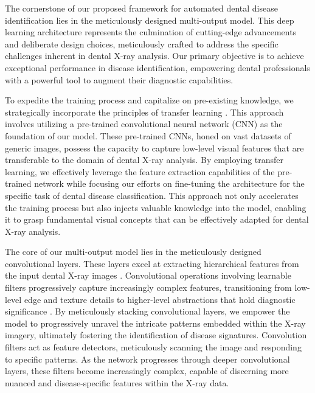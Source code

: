 \documentclass[journal,twoside,web]{ieeecolor}
\begin{document}
The cornerstone of our proposed framework for automated dental disease identification lies in the meticulously designed multi-output model. This deep learning architecture represents the culmination of cutting-edge advancements and deliberate design choices, meticulously crafted to address the specific challenges inherent in dental X-ray analysis. Our primary objective is to achieve exceptional performance in disease identification, empowering dental professionals with a powerful tool to augment their diagnostic capabilities.

To expedite the training process and capitalize on pre-existing knowledge, we strategically incorporate the principles of transfer learning \cite{goodfellow2016deep}. This approach involves utilizing a pre-trained convolutional neural network (CNN) as the foundation of our model. These pre-trained CNNs, honed on vast datasets of generic images, possess the capacity to capture low-level visual features that are transferable to the domain of dental X-ray analysis. By employing transfer learning, we effectively leverage the feature extraction capabilities of the pre-trained network while focusing our efforts on fine-tuning the architecture for the specific task of dental disease classification. This approach not only accelerates the training process but also injects valuable knowledge into the model, enabling it to grasp fundamental visual concepts that can be effectively adapted for dental X-ray analysis.

The core of our multi-output model lies in the meticulously designed convolutional layers. These layers excel at extracting hierarchical features from the input dental X-ray images \cite{zeiler2011adaptive}. Convolutional operations involving learnable filters progressively capture increasingly complex features, transitioning from low-level edge and texture details to higher-level abstractions that hold diagnostic significance \cite{simonyan2014very}. By meticulously stacking convolutional layers, we empower the model to progressively unravel the intricate patterns embedded within the X-ray imagery, ultimately fostering the identification of disease signatures. Convolution filters act as feature detectors, meticulously scanning the image and responding to specific patterns. As the network progresses through deeper convolutional layers, these filters become increasingly complex, capable of discerning more nuanced and disease-specific features within the X-ray data.
\end{document}
